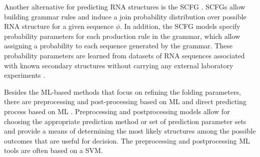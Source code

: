 Another alternative for predicting \ac{RNA} structures is the \ac{SCFG} \cite{sakakibara1994stochastic, rivas2012range, dowell2004evaluation, knudsen1999rna, knudsen2003pfold, woodson2000recent}. \acp{SCFG} allow building grammar rules and induce a join probability distribution over possible \ac{RNA} structure for a given sequence $\phi$. In addition, the \ac{SCFG} models specify probability parameters for each production rule in the grammar, which allow assigning a probability to each sequence generated by the grammar. These probability parameters are learned from datasets of \ac{RNA} sequences associated with known secondary structures without carrying any external laboratory experiments \cite{dowell2004evaluation}. 

Besides the \ac{ML}-based methods that focus on refining the folding parameters, there are preprocessing and post-processing based on \ac{ML} \cite{hor2013tool, zhu2018research,haynes2008using} and direct predicting process based on \ac{ML} \cite{takefuji1990parallel,liu2006hopfield,steeg1993neural}. Preprocessing and postprocessing models allow for choosing the appropriate prediction method or set of prediction parameter sets and provide a means of determining the most likely structures among the possible outcomes that are useful for decision. The preprocessing and postprocessing \ac{ML} tools are often based on a \ac{SVM}. 

